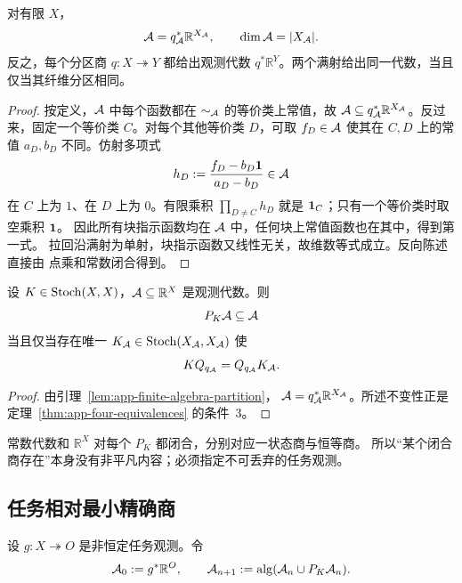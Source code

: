 \begin{lemma}
\label{lem:app-finite-algebra-partition}
对有限 $X$，
\begin{equation}
  \mathcal A=q_{\mathcal A}^*\mathbb R^{X_{\mathcal A}},
  \qquad
  \dim\mathcal A=|X_{\mathcal A}|.
  \label{eq:app-algebra-partition}
\end{equation}
反之，每个分区商 $q:X\twoheadrightarrow Y$ 都给出观测代数
$q^*\mathbb R^Y$。两个满射给出同一代数，当且仅当其纤维分区相同。
\end{lemma}

\begin{proof}
按定义，$\mathcal A$ 中每个函数都在 $\sim_{\mathcal A}$ 的等价类上常值，故
$\mathcal A\subseteq q_{\mathcal A}^*\mathbb R^{X_{\mathcal A}}$。反过来，固定一个等价类
$C$。对每个其他等价类 $D$，可取 $f_D\in\mathcal A$ 使其在 $C,D$ 上的常值
$a_D,b_D$ 不同。仿射多项式
\[
  h_D:=\frac{f_D-b_D\mathbf 1}{a_D-b_D}\in\mathcal A
\]
在 $C$ 上为 $1$、在 $D$ 上为 $0$。有限乘积
$\prod_{D\ne C}h_D$ 就是 $\mathbf 1_C$；只有一个等价类时取空乘积 $\mathbf 1$。
因此所有块指示函数均在 $\mathcal A$ 中，任何块上常值函数也在其中，得到第一式。
拉回沿满射为单射，块指示函数又线性无关，故维数等式成立。反向陈述直接由
点乘和常数闭合得到。
\end{proof}

\begin{theorem}[闭合观测代数与自治商]
\label{thm:app-closed-algebra}
设 $K\in\operatorname{Stoch}(X,X)$，$\mathcal A\subseteq\mathbb R^X$ 是观测代数。则
\[
  P_K\mathcal A\subseteq\mathcal A
\]
当且仅当存在唯一 $K_{\mathcal A}\in\operatorname{Stoch}(X_{\mathcal A},X_{\mathcal A})$ 使
\[
  KQ_{q_{\mathcal A}}=Q_{q_{\mathcal A}}K_{\mathcal A}.
\]
\end{theorem}

\begin{proof}
由引理~\ref{lem:app-finite-algebra-partition}，
$\mathcal A=q_{\mathcal A}^*\mathbb R^{X_{\mathcal A}}$。所述不变性正是
定理~\ref{thm:app-four-equivalences} 的条件~3。
\end{proof}

常数代数和 $\mathbb R^X$ 对每个 $P_K$ 都闭合，分别对应一状态商与恒等商。
所以``某个闭合商存在''本身没有非平凡内容；必须指定不可丢弃的任务观测。

\subsection{任务相对最小精确商}

设 $g:X\twoheadrightarrow O$ 是非恒定任务观测。令
\begin{equation}
  \mathcal A_0:=g^*\mathbb R^O,
  \qquad
  \mathcal A_{n+1}:=\operatorname{alg}(\mathcal A_n\cup P_K\mathcal A_n).
  \label{eq:app-task-algebra-iteration}
\end{equation}

